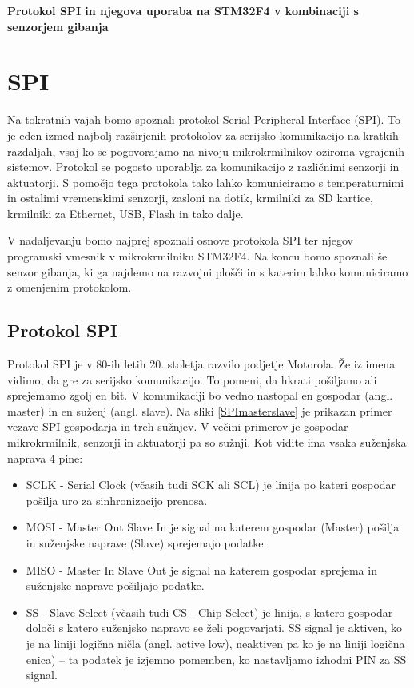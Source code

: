 \documentclass[12pt,letterpaper]{article}
\begin{document}
\begin{center}
    \textbf{\Large Protokol SPI in njegova uporaba na STM32F4 v kombinaciji s senzorjem gibanja}   
\end{center}

\section*{SPI}

Na tokratnih vajah bomo spoznali protokol Serial Peripheral Interface (SPI). To je eden izmed najbolj razširjenih protokolov za serijsko komunikacijo na kratkih razdaljah, vsaj ko se pogovorajamo na nivoju mikrokrmilnikov oziroma vgrajenih sistemov. Protokol se pogosto uporablja za komunikacijo z različnimi senzorji in aktuatorji. S pomočjo tega protokola tako lahko komuniciramo s temperaturnimi in ostalimi vremenskimi senzorji, zasloni na dotik, krmilniki za SD kartice, krmilniki za Ethernet, USB, Flash in tako dalje.

V nadaljevanju bomo najprej spoznali osnove protokola SPI ter njegov programski vmesnik v mikrokrmilniku STM32F4. Na koncu bomo spoznali še senzor gibanja, ki ga najdemo na razvojni plošči in s katerim lahko komuniciramo z omenjenim protokolom.


\subsection*{Protokol SPI}

Protokol SPI je v 80-ih letih 20. stoletja razvilo podjetje Motorola. Že iz imena vidimo, da gre za serijsko komunikacijo. To pomeni, da hkrati pošiljamo ali sprejemamo zgolj en bit. V komunikaciji bo vedno nastopal en gospodar (angl. master) in en suženj (angl. slave). Na sliki \ref{SPImasterslave} je prikazan primer vezave SPI gospodarja in treh sužnjev. V večini primerov je gospodar mikrokrmilnik, senzorji in aktuatorji pa so sužnji. Kot vidite ima vsaka suženjska naprava 4 pine:

\begin{itemize}
    \item SCLK - Serial Clock (včasih tudi SCK ali SCL) je linija po kateri gospodar pošilja uro za sinhronizacijo prenosa.
    \item MOSI - Master Out Slave In je signal na katerem gospodar (Master) pošilja in suženjske naprave (Slave) sprejemajo podatke.
    \item MISO - Master In Slave Out je signal na katerem gospodar sprejema in suženjske naprave pošiljajo podatke.
    \item SS - Slave Select (včasih tudi CS - Chip Select) je linija, s katero gospodar določi s katero suženjsko napravo se želi pogovarjati. SS signal je aktiven, ko je na liniji logična ničla (angl. active low), neaktiven pa ko je na liniji logična enica) -- ta podatek je izjemno pomemben, ko nastavljamo izhodni PIN za SS signal.
\end{itemize}
\end{document}

